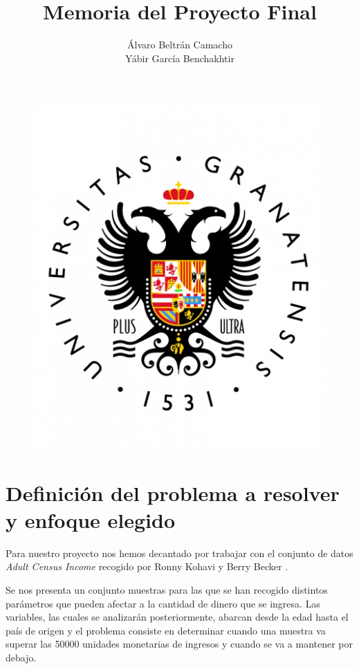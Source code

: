 \documentclass[11pt]{article}
\title{Memoria del Proyecto Final}
\author{Álvaro Beltrán Camacho \\ Yábir García Benchakhtir}
\begin{document}
\maketitle

\begin{figure}[h]
\includegraphics[scale=0.3]{UGR}
\centering
\end{figure}

\newpage

\renewcommand*\contentsname{Índice}
\tableofcontents

\newpage

\section{Definición del problema a resolver y enfoque elegido}

Para nuestro proyecto nos hemos decantado por trabajar con el conjunto de datos
\textit{Adult Census Income} recogido por Ronny Kohavi y Berry Becker \cite{dataset}. 

Se nos presenta un conjunto muestras para las que se han recogido distintos
parámetros que pueden afectar a la cantidad de dinero que se ingresa. Las
variables, las cuales se analizarán posteriormente, abarcan desde la edad
hasta el país de origen y el problema consiste en determinar cuando una muestra
va superar las 50000 unidades monetarias de ingresos y cuando se va a mantener
por debajo.
\end{document}
